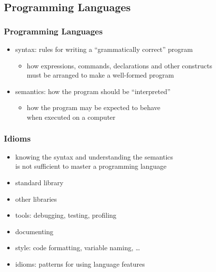 \documentclass[dvipsnames]{beamer}
\theoremstyle{plain}
\begin{document}
\subsection{Programming Languages}

\begin{frame}
  \frametitle{Programming Languages}

  \begin{itemize}
    \item \alert{syntax}: rules for writing a ``grammatically correct'' program
    \begin{itemize}
      \item how expressions, commands, declarations and other constructs\\
        must be arranged to make a well-formed program
    \end{itemize}

    \pause
    \bigskip
    \item \alert{semantics}: how the program should be ``interpreted''
    \begin{itemize}
      \item how the program may be expected to behave\\
        when executed on a computer
    \end{itemize}
  \end{itemize}
\end{frame}

\begin{frame}
  \frametitle{Idioms}

  \begin{itemize}
    \item knowing the syntax and understanding the semantics\\
      is not sufficient to master a programming language

    \bigskip
    \item standard library
    \item other libraries
    \item tools: debugging, testing, profiling
    \item documenting
    \item style: code formatting, variable naming, \ldots

    \pause
    \bigskip
    \item \alert{idioms}: patterns for using language features
  \end{itemize}
\end{frame}
\end{document}
